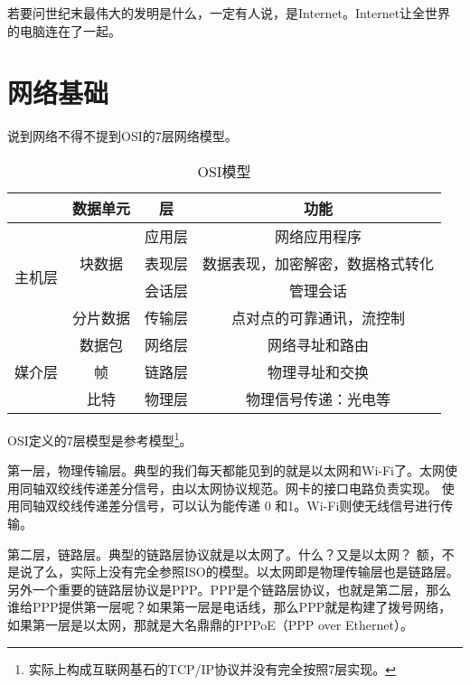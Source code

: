 



若要问世纪末最伟大的发明是什么，一定有人说，是Internet。Internet让全世界的电脑连在了一起。

\section{网络基础}

说到网络不得不提到OSI的7层网络模型。

\begin{table}[h]
\begin{center}
\caption{OSI模型}\label{tabel:ISOmodule}
\begin{tabular}{|c|c|c|c|}
\hline
& 数据单元 & 层 & 功能  \\ \hline %
\multirow{4}{*}{主机层}   &  \multirow{3}{*}{块数据} & 应用层  &  网络应用程序  \\ \cline{3-4}
&						 & 表现层 & 数据表现，加密解密，数据格式转化  \\ \cline{3-4}
&						 & 会话层 & 管理会话 \\ \cline{2-4}
& 分片数据  & 传输层 & 点对点的可靠通讯，流控制 \\ \hline
\multirow{3}{*}{媒介层}  & 数据包   & 网络层 & 网络寻址和路由 \\ \cline{2-4}
& 帧 & 链路层 & 物理寻址和交换 \\ \cline{2-4}
& 比特 & 物理层 & 物理信号传递：光电等 \\\hline
\end{tabular}
\end{center}
\end{table}

OSI定义的7层模型是参考模型\footnote{实际上构成互联网基石的TCP/IP协议并没有完全按照7层实现。}。

第一层，物理传输层。典型的我们每天都能见到的就是以太网和Wi-Fi了。太网使用同轴双绞线传递差分信号，由以太网协议规范。网卡的接口电路负责实现。
使用同轴双绞线传递差分信号，可以认为能传递 0 和1。Wi-Fi则使无线信号进行传输。

第二层，链路层。典型的链路层协议就是以太网了。什么？又是以太网？ 额，不是说了么，实际上没有完全参照ISO的模型。以太网即是物理传输层也是链路层。
另外一个重要的链路层协议是PPP。PPP是个链路层协议，也就是第二层，那么谁给PPP提供第一层呢？如果第一层是电话线，那么PPP就是构建了拨号网络，如果第一层是以太网，那就是大名鼎鼎的PPPoE（PPP over Ethernet）。


